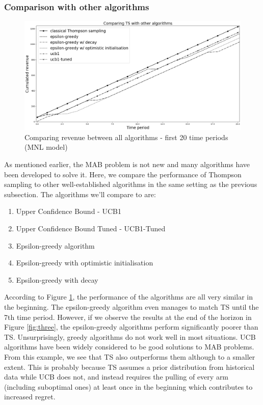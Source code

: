 \documentclass[a4paper]{article}
\begin{document}
\subsubsection{Comparison with other algorithms}
\begin{figure}[h]
	\centering
	\includegraphics[width=1.03\textwidth]{Figure_1-3.png}
	\caption{\label{fig:two}Comparing revenue between all algorithms - first 20 time periods (MNL model)}
\end{figure}
As mentioned earlier, the MAB problem is not new and many algorithms have been developed to solve it. Here, we compare the performance of Thompson sampling to other well-established algorithms in the same setting as the previous subsection. The algorithms we'll compare to are:
\begin{enumerate}
	\item Upper Confidence Bound - UCB1
	\item Upper Confidence Bound Tuned - UCB1-Tuned
	\item Epsilon-greedy algorithm
	\item Epsilon-greedy with optimistic initialisation
	\item Epsilon-greedy with decay	
\end{enumerate}
According to Figure \ref{fig:two}, the performance of the algorithms are all very similar in the beginning. The epsilon-greedy algorithm even manages to match TS until the 7th time period. However, if we observe the results at the end of the horizon in Figure \ref{fig:three}, the epsilon-greedy algorithms perform significantly poorer than TS. Unsurprisingly, greedy algorithms do not work well in most situations. UCB algorithms have been widely considered to be good solutions to MAB problems. From this example, we see that TS also outperforms them although to a smaller extent. This is probably because TS assumes a prior distribution from historical data while UCB does not, and instead requires the pulling of every arm (including suboptimal ones) at least once in the beginning which contributes to increased regret.
\end{document}
